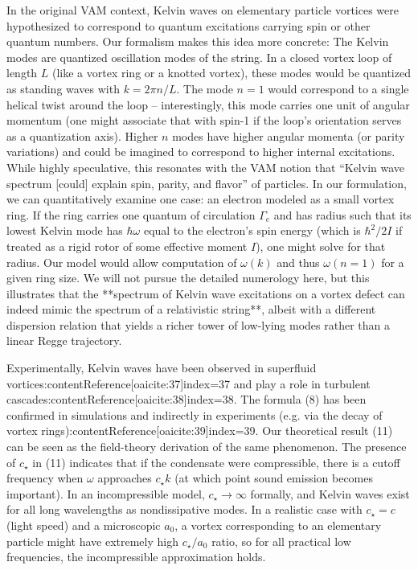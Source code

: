 \documentclass[12pt]{article}
\begin{document}
In the original VAM context, Kelvin waves on elementary particle vortices were hypothesized to correspond to quantum excitations carrying spin or other quantum numbers. Our formalism makes this idea more concrete: The Kelvin modes are quantized oscillation modes of the string. In a closed vortex loop of length $L$ (like a vortex ring or a knotted vortex), these modes would be quantized as standing waves with $k = 2\pi n/L$. The mode $n=1$ would correspond to a single helical twist around the loop – interestingly, this mode carries one unit of angular momentum (one might associate that with spin-1 if the loop’s orientation serves as a quantization axis). Higher $n$ modes have higher angular momenta (or parity variations) and could be imagined to correspond to higher internal excitations. While highly speculative, this resonates with the VAM notion that “Kelvin wave spectrum [could] explain spin, parity, and flavor” of particles. In our formulation, we can quantitatively examine one case: an electron modeled as a small vortex ring. If the ring carries one quantum of circulation $\Gamma_e$ and has radius such that its lowest Kelvin mode has $\hbar \omega$ equal to the electron’s spin energy (which is $\hbar^2/2I$ if treated as a rigid rotor of some effective moment $I$), one might solve for that radius. Our model would allow computation of $\omega(k)$ and thus $\omega(n=1)$ for a given ring size. We will not pursue the detailed numerology here, but this illustrates that the **spectrum of Kelvin wave excitations on a vortex defect can indeed mimic the spectrum of a relativistic string**, albeit with a different dispersion relation that yields a richer tower of low-lying modes rather than a linear Regge trajectory. 

Experimentally, Kelvin waves have been observed in superfluid vortices:contentReference[oaicite:37]{index=37} and play a role in turbulent cascades:contentReference[oaicite:38]{index=38}. The formula (8) has been confirmed in simulations and indirectly in experiments (e.g. via the decay of vortex rings):contentReference[oaicite:39]{index=39}. Our theoretical result (11) can be seen as the field-theory derivation of the same phenomenon. The presence of $c_\star$ in (11) indicates that if the condensate were compressible, there is a cutoff frequency when $\omega$ approaches $c_\star k$ (at which point sound emission becomes important). In an incompressible model, $c_\star \to \infty$ formally, and Kelvin waves exist for all long wavelengths as nondissipative modes. In a realistic case with $c_\star = c$ (light speed) and a microscopic $a_0$, a vortex corresponding to an elementary particle might have extremely high $c_\star/a_0$ ratio, so for all practical low frequencies, the incompressible approximation holds.
\end{document}
